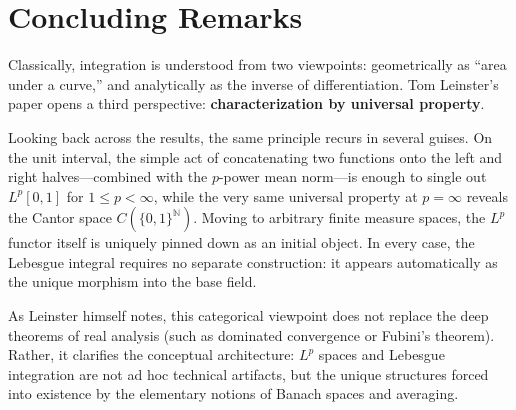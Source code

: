 \section{Concluding Remarks}

Classically, integration is understood from two viewpoints: geometrically as ``area under a curve,'' and analytically as the inverse of differentiation. Tom Leinster's paper opens a third perspective: \textbf{characterization by universal property}.

Looking back across the results, the same principle recurs in several guises. On the unit interval, the simple act of concatenating two functions onto the left and right halves---combined with the $p$-power mean norm---is enough to single out $L^p[0,1]$ for $1 \le p < \infty$, while the very same universal property at $p = \infty$ reveals the Cantor space $C(\{0,1\}^{\mathbb{N}})$. Moving to arbitrary finite measure spaces, the $L^p$ functor itself is uniquely pinned down as an initial object. In every case, the Lebesgue integral requires no separate construction: it appears automatically as the unique morphism into the base field.

As Leinster himself notes, this categorical viewpoint does not replace the deep theorems of real analysis (such as dominated convergence or Fubini's theorem). Rather, it clarifies the conceptual architecture: $L^p$ spaces and Lebesgue integration are not ad hoc technical artifacts, but the unique structures forced into existence by the elementary notions of Banach spaces and averaging.
